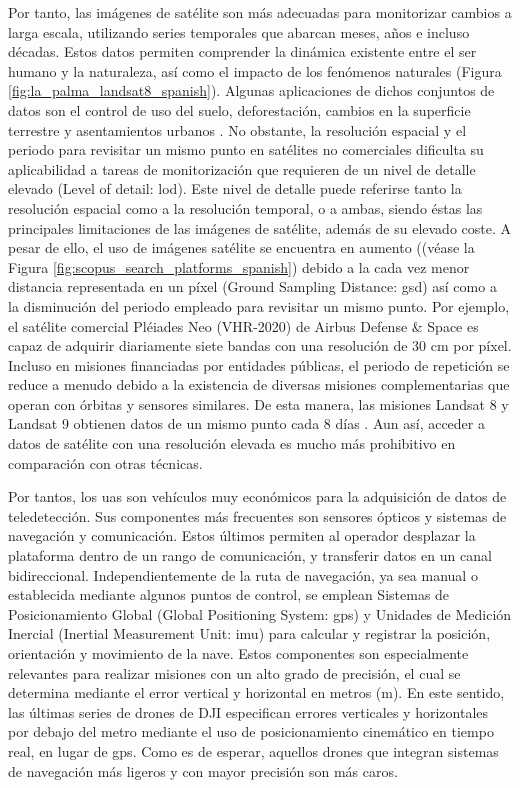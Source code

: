 Por tanto, las imágenes de satélite son más adecuadas para monitorizar cambios a larga escala, utilizando series temporales que abarcan meses, años e incluso décadas. Estos datos permiten comprender la dinámica existente entre el ser humano y la naturaleza, así como el impacto de los fenómenos naturales (Figura \ref{fig:la_palma_landsat8_spanish}). Algunas aplicaciones de dichos conjuntos de datos son el control de uso del suelo, deforestación, cambios en la superficie terrestre y asentamientos urbanos \cite{asokan_change_2019}. No obstante, la resolución espacial y el periodo para revisitar un mismo punto en satélites no comerciales dificulta su aplicabilidad a tareas de monitorización que requieren de un nivel de detalle elevado (Level of detail: \acrshort{lod}). Este nivel de detalle puede referirse tanto la resolución espacial como a la resolución temporal, o a ambas, siendo éstas las principales limitaciones de las imágenes de satélite, además de su elevado coste. A pesar de ello, el uso de imágenes satélite se encuentra en aumento ((véase la Figura \ref{fig:scopus_search_platforms_spanish}) debido a la cada vez menor distancia representada en un píxel (Ground Sampling Distance: \acrshort{gsd}) así como a la disminución del periodo empleado para revisitar un mismo punto. Por ejemplo, el satélite comercial Pléiades Neo (VHR-2020) de Airbus Defense \& Space \cite{airbus_pleiades_2021} es capaz de adquirir diariamente siete bandas con una resolución de 30 \si{\centi\meter} por píxel. Incluso en misiones financiadas por entidades públicas, el periodo de repetición se reduce a menudo debido a la existencia de diversas misiones complementarias que operan con órbitas y sensores similares. De esta manera, las misiones Landsat 8 y Landsat 9 obtienen datos de un mismo punto cada 8 días \cite{masek_landsat_2020}. Aun así, acceder a datos de satélite con una resolución elevada es mucho más prohibitivo en comparación con otras técnicas.

Por tantos, los \acrshort{uas} son vehículos muy económicos para la adquisición de datos de teledetección. Sus componentes más frecuentes son sensores ópticos y sistemas de navegación y comunicación. Estos últimos permiten al operador desplazar la plataforma dentro de un rango de comunicación, y transferir datos en un canal bidireccional. Independientemente de la ruta de navegación, ya sea manual o establecida mediante algunos puntos de control, se emplean Sistemas de Posicionamiento Global (Global Positioning System: \acrshort{gps}) y Unidades de Medición Inercial (Inertial Measurement Unit: \acrshort{imu}) para calcular y registrar la posición, orientación y movimiento de la nave. Estos componentes son especialmente relevantes para realizar misiones con un alto grado de precisión, el cual se determina mediante el error vertical y horizontal en metros (\si{\meter}). En este sentido, las últimas series de drones de DJI especifican errores verticales y horizontales por debajo del metro mediante el uso de posicionamiento cinemático en tiempo real, en lugar de \acrshort{gps}. Como es de esperar, aquellos drones que integran sistemas de navegación más ligeros y con mayor precisión son más caros.    


